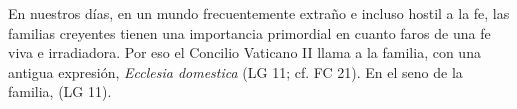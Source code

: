 	 En nuestros días, en un mundo frecuentemente extraño e incluso hostil a la fe, las familias creyentes tienen una importancia primordial en cuanto faros de una fe viva e irradiadora. Por eso el Concilio Vaticano II llama a la familia, con una antigua expresión, \emph{Ecclesia domestica} (LG 11; cf. FC 21). En el seno de la familia,  (LG 11).
